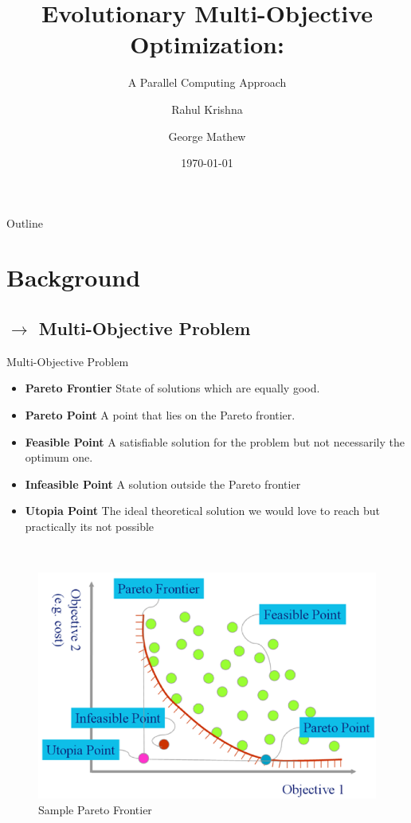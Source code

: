 \documentclass[10pt]{beamer}
\title{Evolutionary Multi-Objective Optimization:}
\subtitle{\Large A Parallel Computing Approach}
\author{Rahul Krishna \and George Mathew}
\institute[NC State University] %
{
  \inst{}%
  Department of Computer Science\\
  North Carolina State University}
\date{\today}
\begin{document}
\begin{frame}
  \titlepage
\end{frame}

\begin{frame}{Outline}
  \scriptsize{\tableofcontents}
\end{frame}

\section{Background}

\subsection{$\rightarrow$ Multi-Objective Problem}
\begin{frame}{Multi-Objective Problem}
  \begin{minipage}{0.45\linewidth}
  \footnotesize{
  \begin{itemize}
  \item<2-> \textbf{Pareto Frontier} State of solutions which are equally good.
  \item<3-> \textbf{Pareto Point} A point that lies on the Pareto frontier.
  \item<4-> \textbf{Feasible Point} A satisfiable solution for the problem but not necessarily the optimum one.
  \item<5-> \textbf{Infeasible Point} A solution outside the Pareto frontier
  \item<6-> \textbf{Utopia Point} The ideal theoretical solution we would love to reach but practically its not possible
  \end{itemize}}
  \end{minipage}~~\begin{minipage}{0.40\linewidth}
  \begin{figure}
  \centering
  \includegraphics[width=\linewidth]{figures/Picture1}
  \caption{Sample Pareto Frontier}
  \label{fig:my_label}
  \end{figure}
  \end{minipage}
\end{frame}
\end{document}
